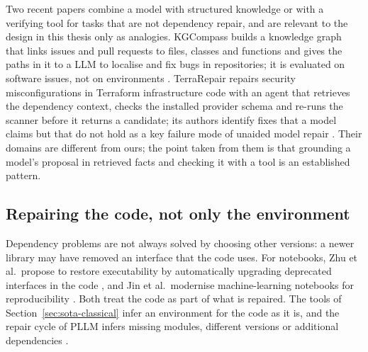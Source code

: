 Two recent papers combine a model with structured knowledge or with a verifying tool for tasks that are not dependency repair, and are relevant to the design in this thesis only as analogies. KGCompass builds a knowledge graph that links issues and pull requests to files, classes and functions and gives the paths in it to a \ac{LLM} to localise and fix bugs in repositories; it is evaluated on software issues, not on environments \cite{yang2025kgcompass}. TerraRepair repairs security misconfigurations in Terraform infrastructure code with an agent that retrieves the dependency context, checks the installed provider schema and re-runs the scanner before it returns a candidate; its authors identify fixes that a model claims but that do not hold as a key failure mode of unaided model repair \cite{mengistu2026terrarepair}. Their domains are different from ours; the point taken from them is that grounding a model's proposal in retrieved facts and checking it with a tool is an established pattern.%

\subsection{Repairing the code, not only the environment}

Dependency problems are not always solved by choosing other versions: a newer library may have removed an interface that the code uses. For notebooks, Zhu et al.\ propose to restore executability by automatically upgrading deprecated interfaces in the code \cite{zhu2021relancer}, and Jin et al.\ modernise machine-learning notebooks for reproducibility \cite{jin2026modernization}. Both treat the code as part of what is repaired.%
The tools of Section~\ref{sec:sota-classical} infer an environment for the code as it is, and the repair cycle of PLLM infers missing modules, different versions or additional dependencies \cite{bartlett2025lastdependency}.%

